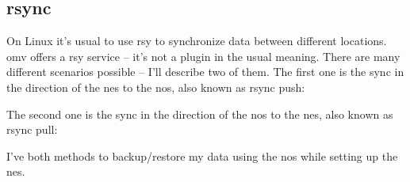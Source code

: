 

\subsection{rsync}

On Linux it's usual to use \gls{rsy} to synchronize data between different
locations. \gls{omv} offers a \gls{rsy} service -- it's not a plugin in the
usual meaning. There are many different scenarios possible -- I'll describe
two of them. The first one is the sync in the direction of the \gls{nes} to
the \gls{nos}, also known as rsync push:



The second one is the sync in the direction of the \gls{nos} to
the \gls{nes}, also known as rsync pull:



I've both methods to backup/restore my data using the \gls{nos} while setting
up the \gls{nes}.
